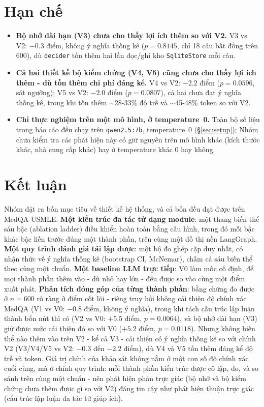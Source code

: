 \documentclass[11pt]{article}
\begin{document}
\section{Hạn chế}
\label{sec:limitations}
\begin{itemize}[nosep]
  \item \textbf{Bộ nhớ dài hạn (V3) chưa cho thấy lợi ích thêm so với V2.} V3 vs V2: $-0.3$ điểm, không
  ý nghĩa thống kê ($p{=}0.8145$, chỉ 18 câu bất đồng trên 600), dù \texttt{decider} tốn thêm hai lần
  đọc/ghi kho \texttt{SqliteStore} mỗi câu.
  \item \textbf{Cả hai thiết kế bộ kiểm chứng (V4, V5) cũng chưa cho thấy lợi ích thêm - dù tốn thêm chi
  phí đáng kể.} V4 vs V2: $-2.2$ điểm ($p{=}0.0596$, sát ngưỡng); V5 vs V2: $-2.0$ điểm ($p{=}0.0807$),
  cả hai chưa đạt ý nghĩa thống kê, trong khi tốn thêm $\sim$28-33\% độ trễ và $\sim$45-48\% token so
  với V2.
  \item \textbf{Chỉ thực nghiệm trên một mô hình, ở temperature~0.} Toàn bộ số liệu trong báo cáo đều
  chạy trên \texttt{qwen2.5:7b}, temperature~0 (\S\ref{sec:setup}); Nhóm chưa kiểm tra các phát hiện này
  có giữ nguyên trên mô hình khác (kích thước khác, nhà cung cấp khác) hay ở temperature khác 0 hay
  không.
\end{itemize}

\FloatBarrier
\section{Kết luận}
\label{sec:conclusion}
Nhóm đặt ra bốn mục tiêu về thiết kế hệ thống, và cả bốn đều đạt được trên MedQA-USMLE. \textbf{Một
kiến trúc đa tác tử dạng module}: một thang biến thể sáu bậc (ablation ladder) điều khiển hoàn toàn
bằng cấu hình, trong đó mỗi bậc khác bậc liền trước đúng một thành phần, trên cùng một đồ thị nền
LangGraph. \textbf{Một quy trình đánh giá tái lập được}: một bộ đo ghép cặp duy nhất, có nhận thức về ý
nghĩa thống kê (bootstrap CI, McNemar), chấm cả sáu biến thể theo cùng một chuẩn. \textbf{Một baseline
LLM trực tiếp}: V0 làm mốc cố định, để mọi thành phần thêm vào - dù nhỏ hay lớn - đều được so vào cùng
một điểm xuất phát. \textbf{Phân tích đóng góp của từng thành phần}: bằng chứng đo được ở $n{=}600$ rõ
ràng ở điểm cốt lõi - riêng truy hồi không cải thiện độ chính xác MedQA (V1 vs V0: $-0.8$ điểm, không ý
nghĩa), trong khi tách cấu trúc lập luận thành bốn nút thì có (V2 vs V0: $+5.5$ điểm, $p{=}0.0064$), và
bộ nhớ dài hạn (V3) giữ được mức cải thiện đó so với V0 ($+5.2$ điểm, $p{=}0.0118$). Nhưng không biến
thể nào thêm vào trên V2 - kể cả V3 - cải thiện có ý nghĩa thống kê so với chính V2 (V3/V4/V5 vs V2:
$-0.3$ đến $-2.2$ điểm), dù V4 và V5 tốn thêm đáng kể độ trễ và token. Giá trị chính của khảo sát không
nằm ở một con số độ chính xác cuối cùng, mà ở chính quy trình: mỗi thành phần kiến trúc được cô lập, đo,
và so sánh trên cùng một chuẩn - nên phát hiện phản trực giác (bộ nhớ và bộ kiểm chứng chưa thêm được gì
so với V2) đáng tin cậy như phát hiện thuận trực giác (cấu trúc lập luận đa tác tử giúp ích).

\nocite{*}


\end{document}
